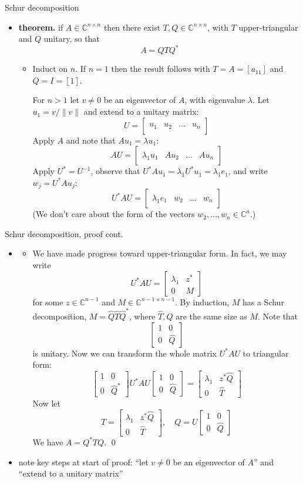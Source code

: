 \documentclass[10pt,hyperref]{beamer}
\newcommand{\CC}{\mathbb{C}}
\newcommand{\trefmatrixthree}[3]{\left[\begin{array}{c|c|c|c} & & & \\ #1 & #2 & \dots & #3 \\ & & & \end{array}\right]}
\newcommand{\blocktwo}[4]{\left[\begin{array}{c|c} #1 & #2 \\ \hline #3 & #4 \end{array}\right]}
\newcommand{\bqed}{{\color{blue}\qed}}
\begin{document}
\begin{frame}{Schur decomposition}

\begin{itemize}
\item \textbf{theorem.} if $A\in \CC^{n\times n}$ then there exist $T,Q\in \CC^{n\times n}$, with $T$ upper-triangular and $Q$ unitary, so that
    $$A = Q T Q^*$$

\vspace{-2mm}
    \begin{itemize}
    \footnotesize
    \item[\emph{proof.}] Induct on $n$.  If $n=1$ then the result follows with $T=A=[a_{11}]$ and $Q=I=[1]$.

\quad For $n>1$ let $v\ne 0$ be an eigenvector of $A$, with eigenvalue $\lambda$. Let $u_1=v/\|v\|$ and extend to a unitary matrix:
    $$U = \trefmatrixthree{u_1}{u_2}{u_n}$$
Apply $A$ and note that $Au_1=\lambda u_1$:
    $$AU = \trefmatrixthree{\lambda_1 u_1}{A u_2}{A u_n}$$
Apply $U^*=U^{-1}$, observe that $U^*Au_1 = \lambda_1 U^* u_1 = \lambda_1 e_1$, and write $w_j=U^*Au_j$:
    $$U^*AU = \trefmatrixthree{\lambda_1 e_1}{w_2}{w_n}$$
(We don't care about the form of the vectors $w_2,\dots,w_n \in \CC^n$.)
    \end{itemize}
\normalsize
\end{itemize}
\end{frame}


\begin{frame}{Schur decomposition, proof cont.}

\begin{itemize}
\item[]
    \begin{itemize}
    \footnotesize
    \item[] \quad We have made progress toward upper-triangular form.  In fact, we may write
    $$U^*AU = \blocktwo{\lambda_1}{z^*}{0}{M}$$
for some $z\in \CC^{n-1}$ and $M\in \CC^{n-1 \times n-1}$.  By induction, $M$ has a Schur decomposition, $M=\hat Q \hat T \hat Q^*$, where $\hat T,\hat Q$ are the same size as $M$.  Note that
    $$\blocktwo{1}{0}{0}{\hat Q}$$
is unitary.  Now we can transform the whole matrix $U^*AU$ to triangular form:
    $$\blocktwo{1}{0}{0}{\hat Q^*} U^*AU \blocktwo{1}{0}{0}{\hat Q} = \blocktwo{\lambda_1}{z^*\hat Q}{0}{\hat T}$$
Now let
    $$T = \blocktwo{\lambda_1}{z^*\hat Q}{0}{\hat T}, \quad Q = U \blocktwo{1}{0}{0}{\hat Q}$$
We have $A=Q^*T Q$. \bqed
    \end{itemize}
\normalsize

\bigskip
\item note key steps at start of proof: ``let $v\ne 0$ be an eigenvector of $A$'' and ``extend to a unitary matrix''
\end{itemize}
\end{frame}
\end{document}
